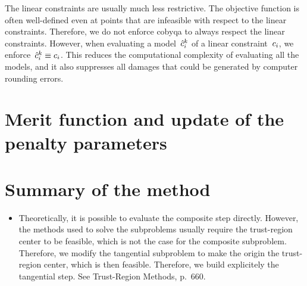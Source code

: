 The linear constraints are usually much less restrictive.
The objective function is often well-defined even at points that are infeasible with respect to the linear constraints.
Therefore, we do not enforce \gls{cobyqa} to always respect the linear constraints.
However, when evaluating a model~$\conm[k]{i}$ of a linear constraint~$c_{i}$, we enforce~$\conm[k]{i} \equiv \con{i}$.
This reduces the computational complexity of evaluating all the models, and it also suppresses all damages that could be generated by computer rounding errors.

\section{Merit function and update of the penalty parameters}

\section{Summary of the method}

\begin{itemize}
    \item Theoretically, it is possible to evaluate the composite step directly.
    However, the methods used to solve the subproblems usually require the trust-region center to be feasible, which is not the case for the composite subproblem.
    Therefore, we modify the tangential subproblem to make the origin the trust-region center, which is then feasible.
    Therefore, we build explicitely the tangential step.
    See Trust-Region Methods, p.~660.
\end{itemize}
